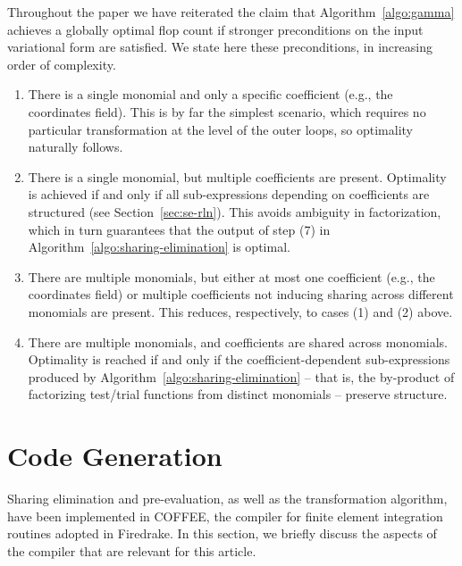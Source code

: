 Throughout the paper we have reiterated the claim that Algorithm~\ref{algo:gamma} achieves a globally optimal flop count if stronger preconditions on the input variational form are satisfied. We state here these preconditions, in increasing order of complexity.
\begin{enumerate}
\item There is a single monomial and only a specific coefficient (e.g., the coordinates field). This is by far the simplest scenario, which requires no particular transformation at the level of the outer loops, so optimality naturally follows.
\item There is a single monomial, but multiple coefficients are present. Optimality is achieved if and only if all sub-expressions depending on coefficients are structured (see Section~\ref{sec:se-rln}). This avoids ambiguity in factorization, which in turn guarantees that the output of step (7) in Algorithm~\ref{algo:sharing-elimination} is optimal.
\item There are multiple monomials, but either at most one coefficient (e.g., the coordinates field) or multiple coefficients not inducing sharing across different monomials are present. This reduces, respectively, to cases (1) and (2) above.
\item There are multiple monomials, and coefficients are shared across monomials. Optimality is reached if and only if the coefficient-dependent sub-expressions produced by Algorithm~\ref{algo:sharing-elimination} -- that is, the by-product of factorizing test/trial functions from distinct monomials -- preserve structure. 
\end{enumerate}


\section{Code Generation}
\label{sec:codegen}
Sharing elimination and pre-evaluation, as well as the transformation algorithm, have been implemented in COFFEE, the compiler for finite element integration routines adopted in Firedrake. In this section, we briefly discuss the aspects of the compiler that are relevant for this article.

